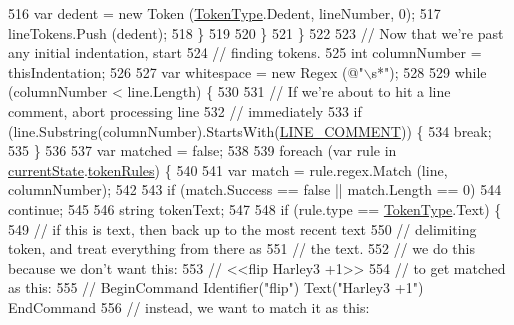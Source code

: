 \begin{DoxyCode}
516                         var dedent = \textcolor{keyword}{new} Token (\hyperlink{a00040_a301aa7c866593a5b625a8fc158bbeace}{TokenType}.Dedent, lineNumber, 0);
517                         lineTokens.Push (dedent);
518                     \}
519 
520                 \}
521             \}
522 
523             \textcolor{comment}{// Now that we're past any initial indentation, start}
524             \textcolor{comment}{// finding tokens.}
525             \textcolor{keywordtype}{int} columnNumber = thisIndentation;
526 
527             var whitespace = \textcolor{keyword}{new} Regex (\textcolor{stringliteral}{@"\(\backslash\)s*"});
528 
529             \textcolor{keywordflow}{while} (columnNumber < line.Length) \{
530 
531                 \textcolor{comment}{// If we're about to hit a line comment, abort processing line}
532                 \textcolor{comment}{// immediately}
533                 \textcolor{keywordflow}{if} (line.Substring(columnNumber).StartsWith(\hyperlink{a00061_a29c457125cc4876f8571f5d9afa372e2}{LINE\_COMMENT})) \{
534                     \textcolor{keywordflow}{break};
535                 \}
536 
537                 var matched = \textcolor{keyword}{false};
538 
539                 \textcolor{keywordflow}{foreach} (var rule \textcolor{keywordflow}{in} \hyperlink{a00061_ac90b7dce8103425a148f9e8588f14137}{currentState}.\hyperlink{a00062_adf6563b1dc6f3ef80ed13c2b15b7be03}{tokenRules}) \{
540                     
541                     var match = rule.regex.Match (line, columnNumber);
542 
543                     \textcolor{keywordflow}{if} (match.Success == \textcolor{keyword}{false} || match.Length == 0)
544                         \textcolor{keywordflow}{continue};
545 
546                     \textcolor{keywordtype}{string} tokenText;
547 
548                     \textcolor{keywordflow}{if} (rule.type == \hyperlink{a00040_a301aa7c866593a5b625a8fc158bbeace}{TokenType}.Text) \{
549                         \textcolor{comment}{// if this is text, then back up to the most recent text }
550                         \textcolor{comment}{// delimiting token, and treat everything from there as}
551                         \textcolor{comment}{// the text.}
552                         \textcolor{comment}{// we do this because we don't want this:}
553                         \textcolor{comment}{//    <<flip Harley3 +1>>}
554                         \textcolor{comment}{// to get matched as this:}
555                         \textcolor{comment}{//    BeginCommand Identifier("flip") Text("Harley3 +1") EndCommand}
556                         \textcolor{comment}{// instead, we want to match it as this:}

\end{DoxyCode}
